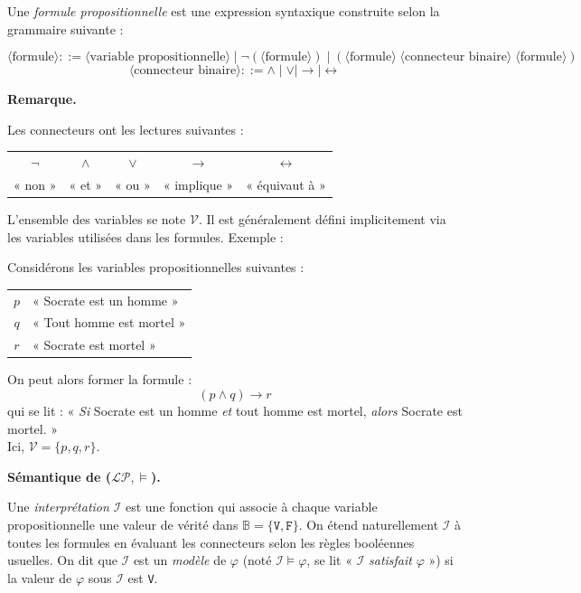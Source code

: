 \documentclass[11pt]{article}
\newenvironment{remarque}{%
    \begin{mdframed}[
        linecolor=sectioncolor!40,
        linewidth=0.8pt,
        backgroundcolor=sectioncolor!5,
        innerleftmargin=10pt,
        innerrightmargin=10pt,
        innertopmargin=6pt,
        innerbottommargin=6pt,
        skipabove=8pt,
        skipbelow=8pt
    ]
    \noindent\textbf{\small\color{sectioncolor}Remarque.}\enspace\small\itshape
}{%
    \end{mdframed}
}
\begin{document}
\vspace{0.2cm}
Une \textit{formule propositionnelle} est une expression syntaxique construite selon la
grammaire suivante :

\[
\langle\text{formule}\rangle ::= \langle\text{variable propositionnelle}\rangle \mid
\neg(\langle\text{formule}\rangle) \mid
(\langle\text{formule}\rangle\;\langle\text{connecteur binaire}\rangle\;\langle\text{formule}\rangle)
\]
\[
\langle\text{connecteur binaire}\rangle ::= \wedge \mid \vee \mid \rightarrow \mid \leftrightarrow
\]

\begin{remarque}
Les connecteurs ont les lectures suivantes :
\begin{center}
\begin{tabular}{ccccc}
    $\neg$ & $\wedge$ & $\vee$ & $\rightarrow$ & $\leftrightarrow$ \\
    « non » & « et » & « ou » & « implique » & « équivaut à »
\end{tabular}
\end{center}
\end{remarque}

\vspace{0.4cm}

L'ensemble des variables se note $\mathcal{V}$. Il est généralement défini implicitement via les variables utilisées dans les formules.
\newpage
Exemple :
\vspace{0.4cm}

\begin{exemple}
\noindent Considérons les variables propositionnelles suivantes :
\begin{center}
\begin{tabular}{cl}
    $p$ & « Socrate est un homme » \\
    $q$ & « Tout homme est mortel » \\
    $r$ & « Socrate est mortel »
\end{tabular}
\end{center}
On peut alors former la formule :
\[
    (p \wedge q) \rightarrow r
\]
qui se lit : « \textit{Si} Socrate est un homme \textit{et} tout homme est mortel, \textit{alors} Socrate est mortel. »\\
Ici, $\mathcal{V} = \{p, q, r\}$.
\end{exemple}

\vspace{0.4cm}
\noindent\textbf{Sémantique de ($\mathcal{L}\mathcal{P}, \models$).}

\vspace{0.2cm}
Une \textit{interprétation} $\mathcal{I}$ est une fonction qui associe à chaque variable
propositionnelle une valeur de vérité dans $\mathbb{B} = \{\texttt{V}, \texttt{F}\}$. On
étend naturellement $\mathcal{I}$ à toutes les formules en évaluant les connecteurs selon les règles
booléennes usuelles. On dit que $\mathcal{I}$ est un \textit{modèle} de $\varphi$ (noté $\mathcal{I} \models
\varphi$, se lit « $\mathcal{I}$ \textit{satisfait} $\varphi$ ») si la valeur de $\varphi$ sous $\mathcal{I}$ est \texttt{V}.
\end{document}
